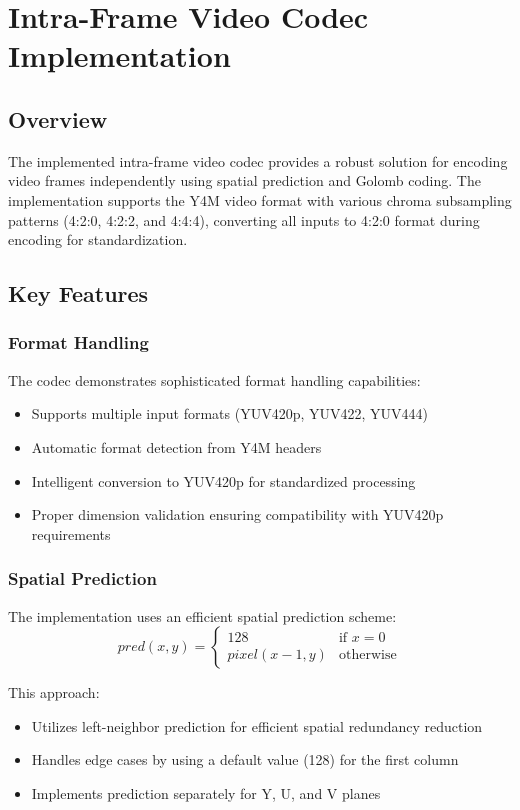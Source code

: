\documentclass[a4paper,14pt]{article}
\begin{document}
\section{Intra-Frame Video Codec Implementation}

\subsection{Overview}
The implemented intra-frame video codec provides a robust solution for encoding video frames independently using spatial prediction and Golomb coding. The implementation supports the Y4M video format with various chroma subsampling patterns (4:2:0, 4:2:2, and 4:4:4), converting all inputs to 4:2:0 format during encoding for standardization.

\subsection{Key Features}

\subsubsection{Format Handling}
The codec demonstrates sophisticated format handling capabilities:
\begin{itemize}
    \item Supports multiple input formats (YUV420p, YUV422, YUV444)
    \item Automatic format detection from Y4M headers
    \item Intelligent conversion to YUV420p for standardized processing
    \item Proper dimension validation ensuring compatibility with YUV420p requirements
\end{itemize}

\subsubsection{Spatial Prediction}
The implementation uses an efficient spatial prediction scheme:
\begin{equation}
    pred(x,y) = \begin{cases}
        128 & \text{if } x = 0 \\
        pixel(x-1,y) & \text{otherwise}
    \end{cases}
\end{equation}

This approach:
\begin{itemize}
    \item Utilizes left-neighbor prediction for efficient spatial redundancy reduction
    \item Handles edge cases by using a default value (128) for the first column
    \item Implements prediction separately for Y, U, and V planes
\end{itemize}
\end{document}
